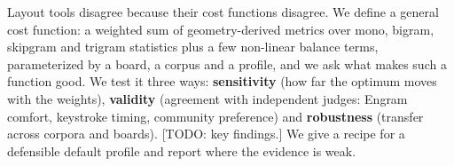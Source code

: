 \documentclass{gecko-paper}
\begin{document}
\makepapertitle
\begin{paperabstract}
Layout tools disagree because their cost functions disagree. We define a
general cost function: a weighted sum of geometry-derived metrics over
mono, bigram, skipgram and trigram statistics plus a few non-linear
balance terms, parameterized by a board, a corpus and a profile, and we
ask what makes such a function good. We test it three ways:
\textbf{sensitivity} (how far the optimum moves with the weights),
\textbf{validity} (agreement with independent judges: Engram comfort,
keystroke timing, community preference) and \textbf{robustness}
(transfer across corpora and boards). {[}TODO: key findings.{]} We give
a recipe for a defensible default profile and report where the evidence
is weak.

\end{paperabstract}
\end{document}

